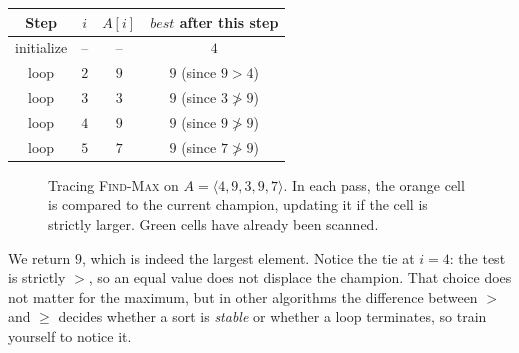\begin{center}
\begin{tabular}{c c c c}
\toprule
Step & $i$ & $A[i]$ & $best$ after this step \\
\midrule
initialize & --  & --        & $4$ \\
loop       & $2$ & $9$       & $9$ \quad (since $9 > 4$) \\
loop       & $3$ & $3$       & $9$ \quad (since $3 \not> 9$) \\
loop       & $4$ & $9$       & $9$ \quad (since $9 \not> 9$) \\
loop       & $5$ & $7$       & $9$ \quad (since $7 \not> 9$) \\
\bottomrule
\end{tabular}
\end{center}

\begin{figure}[H]
\centering
{}
\caption{Tracing \textsc{Find-Max} on $A = \langle 4, 9, 3, 9, 7 \rangle$. In each pass, the orange cell is compared to the current champion, updating it if the cell is strictly larger. Green cells have already been scanned.}
\label{ch01:find-max-trace}
\end{figure}

We return $9$, which is indeed the largest element. Notice the tie at $i = 4$: the
test is strictly $>$, so an equal value does not displace the champion. That choice
does not matter for the maximum, but in other algorithms the difference between
$>$ and $\ge$ decides whether a sort is \emph{stable} or whether a loop terminates,
so train yourself to notice it.

